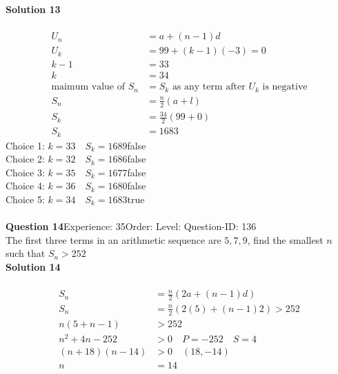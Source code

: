 \documentclass{article}
\begin{document}
\noindent\textbf{Solution 13}\\[2pt]
\\[-35pt]\begin{align*}
U_n&=a+(n-1)d\\[2pt]
U_k&=99+(k-1)(-3)=0\\[2pt]
k-1&=33\\[2pt]
k&=34\\[12pt]
\text{maimum value of} \,\,S_n&=S_k\,\, \text{as any term after}\,\, U_k\,\, \text{is negative}\\[2pt]
S_n&=\displaystyle\frac{n}{2}(a+l)\\[2pt]
S_k&=\displaystyle\frac{34}{2}(99+0)\\[2pt]
S_k&=1683
\end{align*}
Choice 1: \hspace{20pt}$k=33 \quad S_k=1689$\hspace{20pt}false\\
Choice 2: \hspace{20pt}$k=32 \quad S_k=1686$\hspace{20pt}false\\
Choice 3: \hspace{20pt}$k=35 \quad S_k=1677$\hspace{20pt}false\\
Choice 4: \hspace{20pt}$k=36 \quad S_k=1680$\hspace{20pt}false\\
Choice 5: \hspace{20pt}$k=34 \quad S_k=1683$\hspace{20pt}true\\
\\[4pt]
\noindent\textbf{Question 14}\hspace{20pt}Experience: 35\hspace{20pt}Order: \hspace{20pt}Level: \hspace{20pt}Question-ID: 136\\[2pt]
The first three terms in an arithmetic sequence are $5,7,9$, find the smallest $n$ such that $S_n > 252$\\[4pt]
\noindent\textbf{Solution 14}\\[2pt]
\\[-35pt]\begin{align*}
S_n&=\displaystyle\frac{n}{2}(2a+(n-1)d)\\[2pt]
S_n&=\displaystyle\frac{n}{2}(2(5)+(n-1)2)>252\\[2pt]
n(5+n-1)&>252\\[2pt]
n^2+4n-252&>0 \quad P=-252\quad S=4\\[2pt]
(n+18)(n-14)&>0 \quad (18,-14)\\[2pt]
n&=14
\end{align*}
\end{document}
